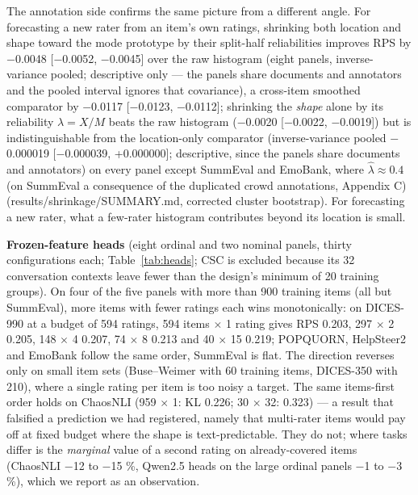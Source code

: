 \documentclass{article}
\begin{document}
The annotation side confirms the same picture from a different angle. For forecasting a new rater from an item's own ratings, shrinking both location and shape toward the mode prototype by their split-half reliabilities improves RPS by $-$0.0048 {[}$-$0.0052, $-$0.0045{]} over the raw histogram (eight panels, inverse-variance pooled; descriptive only --- the panels share documents and annotators and the pooled interval ignores that covariance), a cross-item smoothed comparator by $-$0.0117 {[}$-$0.0123, $-$0.0112{]}; shrinking the \emph{shape} alone by its reliability \(\lambda=X/M\) beats the raw histogram ($-$0.0020 {[}$-$0.0022, $-$0.0019{]}) but is indistinguishable from the location-only comparator (inverse-variance pooled $-$0.000019 {[}$-$0.000039, +0.000000{]}; descriptive, since the panels share documents and annotators) on every panel except SummEval and EmoBank, where \(\hat\lambda\approx0.4\) (on SummEval a consequence of the duplicated crowd annotations, Appendix C) (results/shrinkage/SUMMARY.md, corrected cluster bootstrap). For forecasting a new rater, what a few-rater histogram contributes beyond its location is small.

\textbf{Frozen-feature heads} (eight ordinal and two nominal panels, thirty configurations each; Table~\ref{tab:heads}; CSC is excluded because its 32 conversation contexts leave fewer than the design's minimum of 20 training groups). On four of the five panels with more than 900 training items (all but SummEval), more items with fewer ratings each wins monotonically: on DICES-990 at a budget of 594 ratings, 594 items $\times$ 1 rating gives RPS 0.203, 297 $\times$ 2 0.205, 148 $\times$ 4 0.207, 74 $\times$ 8 0.213 and 40 $\times$ 15 0.219; POPQUORN, HelpSteer2 and EmoBank follow the same order, SummEval is flat. The direction reverses only on small item sets (Buse--Weimer with 60 training items, DICES-350 with 210), where a single rating per item is too noisy a target. The same items-first order holds on ChaosNLI (959 $\times$ 1: KL 0.226; 30 $\times$ 32: 0.323) --- a result that falsified a prediction we had registered, namely that multi-rater items would pay off at fixed budget where the shape is text-predictable. They do not; where tasks differ is the \emph{marginal} value of a second rating on already-covered items (ChaosNLI $-$12 to $-$15 \%, Qwen2.5 heads on the large ordinal panels $-$1 to $-$3 \%), which we report as an observation.
\end{document}
